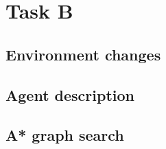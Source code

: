
\chapter{Task B}
\section{Environment changes}

\section{Agent description}

\section{A* graph search}


